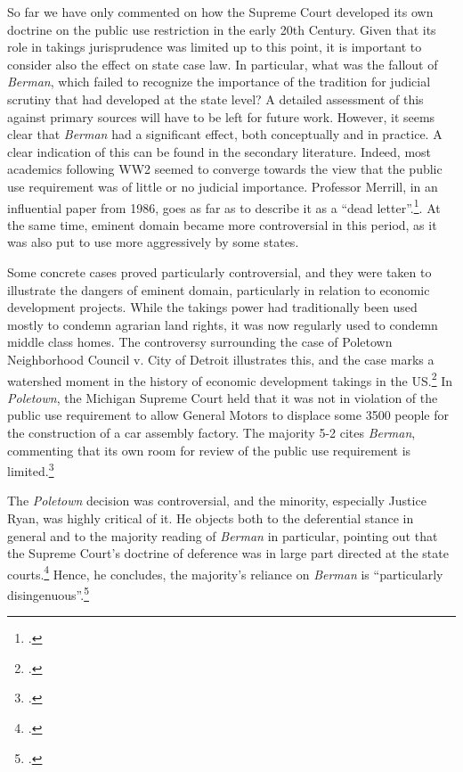 \documentclass[12pt,a4paper]{book} %
\begin{document}
So far we have only commented on how the Supreme Court developed its own doctrine on the public use restriction in the early 20th Century. Given that its role in takings jurisprudence was limited up to this point, it is important to consider also the effect on state case law. In particular, what was the fallout of {\it Berman}, which failed to recognize the importance of the tradition for judicial scrutiny that had developed at the state level? A detailed assessment of this against primary sources will have to be left for future work. However, it seems clear that {\it Berman} had a significant effect, both conceptually and in practice. A clear indication of this can be found in the secondary literature. Indeed, most academics following WW2 seemed to converge towards the view that the public use requirement was of little or no judicial importance. Professor Merrill, in an influential paper from 1986, goes as far as to describe it as a ``dead letter''.\footcite{merrill86}. At the same time, eminent domain became more controversial in this period, as it was also put to use more aggressively by some states.

 Some concrete cases proved particularly controversial, and they were taken to illustrate the dangers of eminent domain, particularly in relation to economic development projects. While the takings power had traditionally been used mostly to condemn agrarian land rights, it was now regularly used to condemn middle class homes. The controversy surrounding the case of Poletown Neighborhood Council v. City of Detroit  illustrates this, and the case marks a watershed moment in the history of  economic development takings in the US.\footcite[See][380-381]{sandefur05} In {\it Poletown}, the Michigan Supreme Court held that it was not in violation of the public use requirement to allow General Motors to displace some 3500 people for the construction of a car assembly factory. The majority 5-2 cites {\it Berman}, commenting that its own room for review of the public use requirement is limited.\footcite[632-633]{poletown81}

The {\it Poletown} decision was controversial, and the minority, especially Justice Ryan, was highly critical of it. He objects both to the deferential stance in general and to the majority reading of {\it Berman} in particular, pointing out that the Supreme Court's doctrine of deference was in large part directed at the state courts.\footcite[668]{poletown81} Hence, he concludes, the majority's reliance on {\it Berman} is ``particularly disingenuous''.\footcite[668]{poletown81} 
\end{document}
